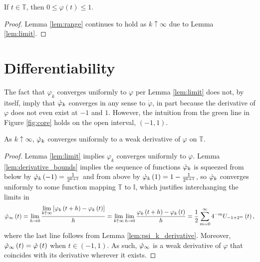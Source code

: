 \begin{lemma}
  \label{lem:range_limit}
  If $t \in \mathbb{T}$, then $0 \leq \varphi\left(t\right) \leq 1$.
\end{lemma}
\begin{proof}
    Lemma \ref{lem:range} continues to hold as $k \uparrow \infty$ due to Lemma \ref{lem:limit}.
\end{proof}

\section{Differentiability}\label{sec:Differentiability}

The fact that $\varphi_k$ converges uniformly to $\varphi$ per Lemma \ref{lem:limit} does not, by itself, imply that $\dotvarphi{k}$ converges in any sense to $\dot{\varphi}$, in part because the derivative of $\varphi$ does not even exist at $-1$ and $1$. However, the intuition from the green line in Figure \ref{fig:core} holds on the open interval, $\left(-1,1\right)$.

\begin{lemma}[]
  \label{lem:weak_derivative}
  As $k \uparrow \infty$, $\dotvarphi{k}$ converges uniformly to a weak derivative of $\varphi$ on $\mathbb{T}$.
\end{lemma}
\begin{proof}
  Lemma \ref{lem:limit} implies $\varphi_k$ converges uniformly to $\varphi$. Lemma \ref{lem:derivative_bounds} implies the sequence of functions $\dotvarphi{k}$ is squeezed from below by $\dotvarphi[-1]{k} = \frac{1}{2^{k + 1}}$ and from above by $\dotvarphi[1]{k} = 1 - \frac{1}{2^{k + 1}}$, so $\dotvarphi{k}$ converges uniformly to some function mapping $\mathbb{T}$ to $\mathbb{I}$, which justifies interchanging the limits in
  \begin{eqnarray*}
  \dotvarphi[t]{\infty} = \lim\limits_{h \rightarrow 0} \frac{\lim\limits_{k \uparrow \infty} \left[\varphi_k\left(t + h\right) - \varphi_k\left(t\right)\right]}{h} =
  \lim\limits_{k \uparrow \infty} \lim\limits_{h \rightarrow 0} \frac{\varphi_k\left(t + h\right) - \varphi_k\left(t\right)}{h} =
  \frac{1}{2} \sum\limits_{m = 0}^\infty 4^{-m} U_{-1 + 2^m}\left(t\right),
  \end{eqnarray*}
  where the last line follows from Lemma \ref{lem:psi_k_derivative}. Moreover, $\dotvarphi[t]{\infty} = \dotvarphi[t]{}$ when $t \in \left(-1,1\right)$. As such, $\dotvarphi{\infty}$ is a weak derivative of $\varphi$ that coincides with its derivative wherever it exists.
\end{proof}

